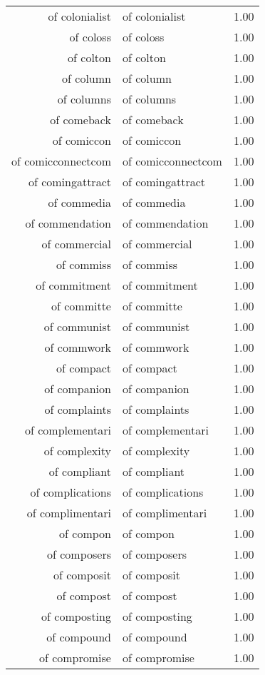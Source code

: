 \begin{table}[ht]
\begin{tabular}{rlr}
  of colonialist & of colonialist & 1.00 \\ 
  of coloss & of coloss & 1.00 \\ 
  of colton & of colton & 1.00 \\ 
  of column & of column & 1.00 \\ 
  of columns & of columns & 1.00 \\ 
  of comeback & of comeback & 1.00 \\ 
  of comiccon & of comiccon & 1.00 \\ 
  of comicconnectcom & of comicconnectcom & 1.00 \\ 
  of comingattract & of comingattract & 1.00 \\ 
  of commedia & of commedia & 1.00 \\ 
  of commendation & of commendation & 1.00 \\ 
  of commercial & of commercial & 1.00 \\ 
  of commiss & of commiss & 1.00 \\ 
  of commitment & of commitment & 1.00 \\ 
  of committe & of committe & 1.00 \\ 
  of communist & of communist & 1.00 \\ 
  of commwork & of commwork & 1.00 \\ 
  of compact & of compact & 1.00 \\ 
  of companion & of companion & 1.00 \\ 
  of complaints & of complaints & 1.00 \\ 
  of complementari & of complementari & 1.00 \\ 
  of complexity & of complexity & 1.00 \\ 
  of compliant & of compliant & 1.00 \\ 
  of complications & of complications & 1.00 \\ 
  of complimentari & of complimentari & 1.00 \\ 
  of compon & of compon & 1.00 \\ 
  of composers & of composers & 1.00 \\ 
  of composit & of composit & 1.00 \\ 
  of compost & of compost & 1.00 \\ 
  of composting & of composting & 1.00 \\ 
  of compound & of compound & 1.00 \\ 
  of compromise & of compromise & 1.00 \\ 

\end{tabular}
\end{table}
